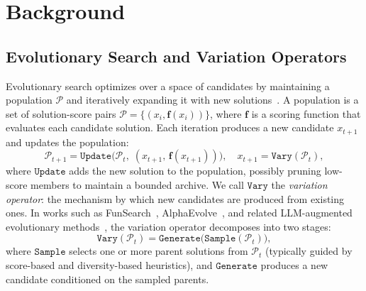 \section{Background}
\label{sec:background}

\subsection{Evolutionary Search and Variation Operators}
\label{sec:background_evo}

Evolutionary search optimizes over a space of candidates by maintaining a population $\mathcal{P}$ and iteratively expanding it with new solutions~\citep{back1997evolutionary}.
A population is a set of solution-score pairs $\mathcal{P} = \{(x_i, \mathbf{f}(x_i))\}$, where $\mathbf{f}$ is a scoring function that evaluates each candidate solution.
Each iteration produces a new candidate $x_{t+1}$ and updates the population:
\begin{equation}
\label{eq:evo_loop}
\mathcal{P}_{t+1} = \texttt{Update}\!\big(\mathcal{P}_t,\; (x_{t+1},\, \mathbf{f}(x_{t+1}))\big), \quad x_{t+1} = \texttt{Vary}(\mathcal{P}_t),
\end{equation}
where $\texttt{Update}$ adds the new solution to the population, possibly pruning low-score members to maintain a bounded archive.
We call $\texttt{Vary}$ the \emph{variation operator}: the mechanism by which new candidates are produced from existing ones.
In works such as FunSearch~\citep{funsearch2024}, AlphaEvolve~\citep{alphaevolve2025}, and related LLM-augmented evolutionary methods~\citep{lehman2022elm, ye2024reevo, chen2023evoprompting}, the variation operator decomposes into two stages:
\begin{equation}
\label{eq:classical_vary}
\texttt{Vary}(\mathcal{P}_t) = \texttt{Generate}\!\big(\texttt{Sample}(\mathcal{P}_t)\big),
\end{equation}
where $\texttt{Sample}$ selects one or more parent solutions from $\mathcal{P}_t$ (typically guided by score-based and diversity-based heuristics), and $\texttt{Generate}$ produces a new candidate conditioned on the sampled parents.

